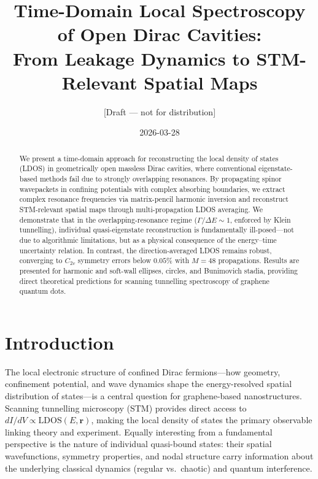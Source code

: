 \documentclass[11pt,a4paper]{article}
\title{\Large\bfseries Time-Domain Local Spectroscopy of Open Dirac Cavities:\\
From Leakage Dynamics to STM-Relevant Spatial Maps}
\author{[Draft --- not for distribution]}
\date{2026-03-28}
\newcommand{\vb}[1]{\mathbf{#1}}
\begin{document}
\maketitle

\begin{abstract}
We present a time-domain approach for reconstructing the local density
of states (LDOS) in geometrically open massless Dirac cavities, where
conventional eigenstate-based methods fail due to strongly overlapping
resonances.  By propagating spinor wavepackets in confining potentials
with complex absorbing boundaries, we extract complex resonance
frequencies via matrix-pencil harmonic inversion and reconstruct
STM-relevant spatial maps through multi-propagation LDOS averaging.
We demonstrate that in the overlapping-resonance regime
($\Gamma/\Delta E \sim 1$, enforced by Klein tunnelling), individual
quasi-eigenstate reconstruction is fundamentally ill-posed---not due
to algorithmic limitations, but as a physical consequence of the
energy--time uncertainty relation.  In contrast, the direction-averaged
LDOS remains robust, converging to $C_{2v}$ symmetry errors below
$0.05\%$ with $M = 48$ propagations.  Results are presented for
harmonic and soft-wall ellipses, circles, and Bunimovich stadia,
providing direct theoretical predictions for scanning tunnelling
spectroscopy of graphene quantum dots.
\end{abstract}

\tableofcontents
\vspace{1em}

\section{Introduction}
\label{sec:intro}


The local electronic structure of confined Dirac fermions---how
geometry, confinement potential, and wave dynamics shape the
energy-resolved spatial distribution of states---is a central
question for graphene-based nanostructures.
Scanning tunnelling microscopy (STM) provides direct access to
$dI/dV \propto \text{LDOS}(E, \vb{r})$, making the local density of
states the primary observable linking theory and experiment.
Equally interesting from a fundamental perspective is the nature of
individual quasi-bound states: their spatial wavefunctions, symmetry
properties, and nodal structure carry information about the underlying
classical dynamics (regular vs.\ chaotic) and quantum interference.
\end{document}
